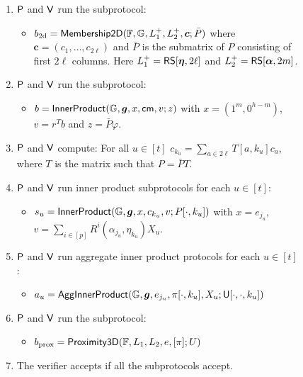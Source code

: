 \begin{figure}[h!]
\begin{framed}
\begin{itemize}
\begin{enumerate}[{\rm 1.}]
\item $\mathsf{P}$ and $\mathsf{V}$ run the subprotocol:
	\begin{itemize}
	\item $b_{\rm 2d} = \mathsf{Membership2D}(\mathbb{F},\mathbb{G},L^{+}_1,L^{+}_2,\bm{c};\bar{P})$
where $\bm{c}=(c_1,\ldots,c_{2\ell})$ and $\bar{P}$ is the submatrix of $P$
consisting of first $2\ell$ columns. Here $L^{+}_1=\mathsf{RS}[\bm{\eta},2\ell]$ and
$L^{+}_2=\mathsf{RS}[\bm{\alpha},2m]$.
	\end{itemize}
\item $\mathsf{P}$ and $\mathsf{V}$ run the subprotocol:
	\begin{itemize}
	\item $b = \mathsf{InnerProduct}(\mathbb{G},\bm{g},x,\mathsf{cm},v;z)$
with $x=(1^m,0^{h-m})$, $v=r^Tb$ and $z=\bar{P}\varphi$.
	\end{itemize}
\item $\mathsf{P}$ and $\mathsf{V}$ compute: For all $u\in [t]$ $c_{k_u} =
\sum_{a\in 2\ell}T[a,k_u]c_a$, where $T$ is the matrix such that $P=\bar{P}T$.
\item $\mathsf{P}$ and $\mathsf{V}$ run inner product subprotocols for each $u\in
[t]$:
	\begin{itemize}
	\item $s_u=\mathsf{InnerProduct}(\mathbb{G},\bm{g},x,c_{k_u},v;P[\cdot,k_u])$ with
$x=e_{j_u}$, $v=\sum_{i\in [p]}R^i(\alpha_{j_u},\eta_{k_u})X_u$.
	\end{itemize}
\item $\mathsf{P}$ and $\mathsf{V}$ run aggregate inner product protocols for each
$u\in [t]$:
	\begin{itemize}
	\item
$a_u=\mathsf{AggInnerProduct}(\mathbb{G},\bm{g},e_{j_u},\pi[\cdot,k_u],X_u;\mathsf{U}[\cdot,\cdot,k_u])$
	\end{itemize}
\item $\mathsf{P}$ and $\mathsf{V}$ run the subprotocol: 
	\begin{itemize}
	\item $b_{\rm prox} = \mathsf{Proximity3D}(\mathbb{F},L_1,L_2,e,[\pi];U)$
	\end{itemize}
\item The verifier accepts if all the subprotocols accept.
\end{enumerate}
\end{itemize}


\end{framed}
\end{figure}
